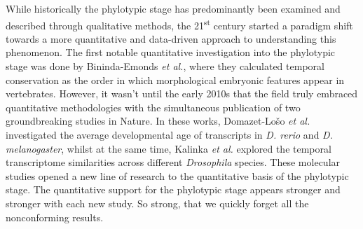 While historically the phylotypic stage has predominantly been examined and described through qualitative methods, the 21\textsuperscript{st} century started a paradigm shift towards a more quantitative and data-driven approach to understanding this phenomenon\cite{Chan2021}. The first notable quantitative investigation into the phylotypic stage was done by Bininda-Emonds \textit{et al.}, where they calculated temporal conservation as the order in which morphological embryonic features appear in vertebrates\cite{OlafRP2003}. However, it wasn't until the early 2010s that the field truly embraced quantitative methodologies with the simultaneous publication of two groundbreaking studies in Nature\cite{Kalinka2010, DomazetLoso2010}. In these works, Domazet-Lošo \textit{et al.} investigated the average developmental age of transcripts in \textit{D. rerio} and \textit{D. melanogaster}, whilst at the same time, Kalinka \textit{et al.} explored the temporal transcriptome similarities across different \textit{Drosophila} species. These molecular studies opened a new line of research to the quantitative basis of the phylotypic stage. The quantitative support for the phylotypic stage appears stronger and stronger with each new study. So strong, that we quickly forget all the nonconforming results.


